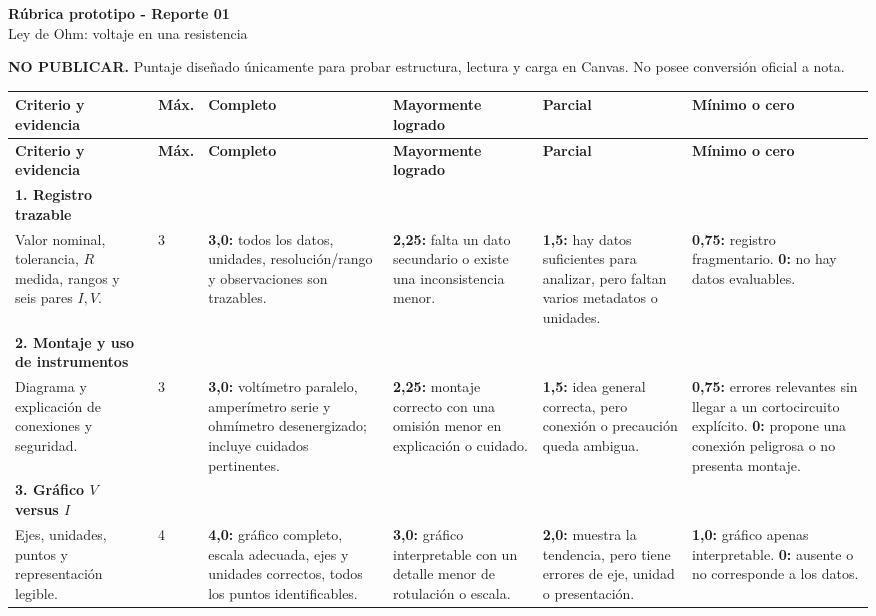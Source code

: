 \documentclass[10pt,letterpaper,landscape]{article}
\begin{document}
{\color{azul}\LARGE\bfseries Rúbrica prototipo - Reporte 01}\\
{\large Ley de Ohm: voltaje en una resistencia}

\colorbox{red!10}{\parbox{0.98\textwidth}{
\textbf{NO PUBLICAR.} Puntaje diseñado únicamente para probar estructura,
lectura y carga en Canvas. No posee conversión oficial a nota.}}

\small
\begin{longtable}{P{3.0cm}P{1.0cm}P{4.55cm}P{4.35cm}P{4.15cm}P{3.85cm}}
\color{white}\textbf{Criterio y evidencia} &
\color{white}\textbf{Máx.} &
\color{white}\textbf{Completo} &
\color{white}\textbf{Mayormente logrado} &
\color{white}\textbf{Parcial} &
\color{white}\textbf{Mínimo o cero}\\
\endfirsthead
{}
\color{white}\textbf{Criterio y evidencia} &
\color{white}\textbf{Máx.} &
\color{white}\textbf{Completo} &
\color{white}\textbf{Mayormente logrado} &
\color{white}\textbf{Parcial} &
\color{white}\textbf{Mínimo o cero}\\
\endhead

\textbf{1. Registro trazable}\\
Valor nominal, tolerancia, \(R\) medida, rangos y seis pares \(I,V\). &
3 &
\textbf{3,0:} todos los datos, unidades, resolución/rango y observaciones son
trazables. &
\textbf{2,25:} falta un dato secundario o existe una inconsistencia menor. &
\textbf{1,5:} hay datos suficientes para analizar, pero faltan varios metadatos
o unidades. &
\textbf{0,75:} registro fragmentario. \textbf{0:} no hay datos evaluables.\\

\textbf{2. Montaje y uso de instrumentos}\\
Diagrama y explicación de conexiones y seguridad. &
3 &
\textbf{3,0:} voltímetro paralelo, amperímetro serie y ohmímetro desenergizado;
incluye cuidados pertinentes. &
\textbf{2,25:} montaje correcto con una omisión menor en explicación o cuidado. &
\textbf{1,5:} idea general correcta, pero conexión o precaución queda ambigua. &
\textbf{0,75:} errores relevantes sin llegar a un cortocircuito explícito.
\textbf{0:} propone una conexión peligrosa o no presenta montaje.\\

\textbf{3. Gráfico \(V\) versus \(I\)}\\
Ejes, unidades, puntos y representación legible. &
4 &
\textbf{4,0:} gráfico completo, escala adecuada, ejes y unidades correctos,
todos los puntos identificables. &
\textbf{3,0:} gráfico interpretable con un detalle menor de rotulación o escala. &
\textbf{2,0:} muestra la tendencia, pero tiene errores de eje, unidad o
presentación. &
\textbf{1,0:} gráfico apenas interpretable. \textbf{0:} ausente o no corresponde
a los datos.\\

\end{longtable}
\end{document}
